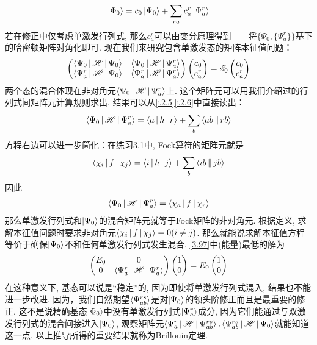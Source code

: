 \begin{align}
	\Ket{\Phi_0} = c_0\Ket{\Psi_0} + \sum_{ra}c_a^r\Ket{\Psi_a^r}
\end{align}
若在修正中仅考虑单激发行列式, 
那么$c_a^r$可以由变分原理得到——将$\{\Psi_0,\{\Psi_a^r\}\}$基下的哈密顿矩阵对角化即可. 
现在我们来研究包含单激发态的矩阵本征值问题：
\begin{align}
	\label{3.97}
	\begin{pmatrix}
		\Braket{\Psi_0|\mathscr{H}|\Psi_0}   & \Braket{\Psi_0|\mathscr{H}|\Psi_a^r}   \\
		\Braket{\Psi_a^r|\mathscr{H}|\Psi_0} & \Braket{\Psi_a^r|\mathscr{H}|\Psi_a^r}
	\end{pmatrix}
	\begin{pmatrix}
		c_0\\
		c_a^r
	\end{pmatrix}
	=\mathscr{E}_0
	\begin{pmatrix}
		c_0\\
		c_a^r
	\end{pmatrix}
\end{align}
两个态的混合体现在非对角元$\Braket{\Psi_0|\mathscr{H}|\Psi_a^r}$上. 
这个矩阵元可以用我们介绍过的行列式间矩阵元计算规则求出, 
结果可以从\autoref{t2.5}\autoref{t2.6}中直接读出：
\begin{align}
	\Braket{\Psi_0|\mathscr{H}|\Psi_a^r} = \Braket{a|h|r} + \sum_b\Braket{ab||rb}
\end{align}
方程右边可以进一步简化：在练习3.1中, 
Fock算符的矩阵元就是
\begin{align}
	\Braket{\chi_i|f|\chi_j} = \Braket{i|h|j} + \sum_b\Braket{ib||jb}
\end{align} 
因此
\begin{align}
	\Braket{\Psi_0|\mathscr{H}|\Psi_a^r} = \Braket{\chi_a|f|\chi_r}
\end{align}
那么单激发行列式和$\Ket{\Psi_0}$的混合矩阵元就等于Fock矩阵的非对角元.
根据定义, 
求解\hft 本征值问题时要求非对角元$\Braket{\chi_i|f|\chi_j}=0(i\neq j)$. 
那么就能说求解\hft 本征值方程等价于确保$\Ket{\Psi_0}$不和任何单激发行列式发生混合. 
\autoref{3.97}中(能量)最低的解为
\begin{align}
	\begin{pmatrix}
		E_0 & 0\\
		0   & \Braket{\Psi_a^r|\mathscr{H}|\Psi_a^r}
	\end{pmatrix}
	\begin{pmatrix}
		1\\0
	\end{pmatrix}
	=E_0
	\begin{pmatrix}
		1\\0
	\end{pmatrix}
\end{align}
在这种意义下, 
\hft 基态可以说是“稳定”的, 
因为即使将单激发行列式混入, 
结果也不能进一步改进. 
因为，我们自然期望$\Braket{\Psi_{ab}^{rs}}$是对$\Ket{\Psi_0}$的领头阶修正而且是最重要的修正. 
这不是说精确基态$\Ket{\Phi_0}$中没有单激发行列式$\Ket{\Psi_a^r}$成分, 
因为它们能通过与双激发行列式的混合间接进入$\Ket{\Psi_0}$, 
观察矩阵元$\Braket{\Psi_a^r|\mathscr{H}|\Psi_{ab}^{rs}},\Braket{\Psi_{ab}^{rs}|\mathscr{H}|\Psi_0}$就能知道这一点. 
以上推导所得的重要结果就称为Brillouin定理. 


